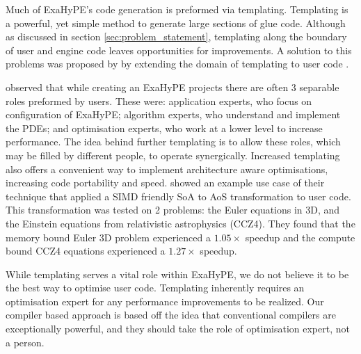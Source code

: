 


Much of ExaHyPE's code generation is preformed via templating.
Templating is a powerful, yet simple method to generate large sections of glue code.
Although as discussed in section \ref{sec:problem_statement}, templating along the boundary of user and engine code leaves opportunities for improvements.  
A solution to this problems was proposed by \citeauthor{templateExahype} by extending the domain of templating to user code \cite{templateExahype}.

\citeauthor{templateExahype} observed that while creating an ExaHyPE projects there are often 3 separable roles preformed by users.
These were: application experts, who focus on configuration of ExaHyPE; algorithm experts, who understand and implement the PDEs; and optimisation experts, who work at a lower level to increase performance.
The idea behind further templating is to allow these roles, which may be filled by different people, to operate synergically.
Increased templating also offers a convenient way to implement architecture aware optimisations, increasing code portability and speed.
\citeauthor{templateExahype} showed an example use case of their technique that applied a SIMD friendly SoA to AoS transformation to user code.
This transformation was tested on 2 problems: the Euler equations in 3D, and the Einstein equations from relativistic astrophysics (CCZ4).
They found that the memory bound Euler 3D problem experienced a $1.05\times$ speedup and the compute bound CCZ4 equations experienced a $1.27\times$ speedup.

While templating serves a vital role within ExaHyPE, we do not believe it to be the best way to optimise user code.
Templating inherently requires an optimisation expert for any performance improvements to be realized.
Our compiler based approach is based off the idea that conventional compilers are exceptionally powerful, and they should take the role of optimisation expert, not a person. 



\cite{YATeTo}

\cite{FiredrakeAndCOFFEE}


\cite{codegen_dg_SIMD}

